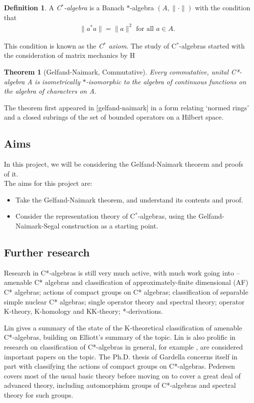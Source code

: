 \documentclass[12pt,a4paper]{amsart}
\theoremstyle{plain}
\newtheorem*{thm*}{Theorem}
\theoremstyle{definition}
\newtheorem{defn}{Definition}
\begin{document}
\begin{defn}
A \emph{C$^\ast$-algebra} is a Banach $\ast$-algebra $(A, \| \cdot \|)$ with the condition that
\begin{align*}
	\|a ^\ast a\| = \|a\|^2 \mbox{ for all } a \in A.
\end{align*}
\end{defn}
 
This condition is known as the \emph{C$^\ast$ axiom}. The study of C$^\ast$-algebras started with the consideration of matrix mechanics by H


\begin{thm*}[Gelfand-Naimark, Commutative]
	Every commutative, unital C*-algebra A is isometrically $\ast$-isomorphic to the algebra of continuous functions on the algebra of characters on A.

\end{thm*}
The theorem first appeared in [gelfand-naimark] in a form relating `normed rings' and a closed subrings of the set of bounded operators on a Hilbert space.


\subsection{Aims}
	In this project, we will be considering the Gelfand-Naimark theorem and proofs of it. \\
	
The aims for this project are:
\begin{itemize}
	\item Take the Gelfand-Naimark theorem, and understand its contents and proof.
	\item Consider the representation theory of C$^\ast$-algebras, using the Gelfand-Naimark-Segal construction as a starting point.
\end{itemize}

\subsection{Further research}
	Research in C*-algebras is still very much active, with much work going into -- amenable C* algebras and classification of approximately-finite dimensional (AF) C* algebras;  actions of compact groups on C* algebras; classification of separable simple nuclear C* algebras; single operator theory and spectral theory; operator K-theory, K-homology and KK-theory; *-derivations.
	
	
	Lin \cite{lin01} gives a summary of the state of the K-theoretical classification of amenable C*-algebras, building on Elliott's summary \cite{elliott94} of the topic. 
	Lin is also prolific in research on classification of C*-algebras in general, for example \cite{lin08}, \cite{lin11} are considered important papers on the topic.
	The Ph.D. thesis of Gardella \cite{gardella15} concerns itself in part with classifying the actions of compact groups on C*-algebras.
	Pedersen \cite{pedersen79} covers most of the usual basic theory before moving on to cover a great deal of advanced theory, including automorphism groups of C*-algebras and spectral theory for such groups.
	
\end{document}

